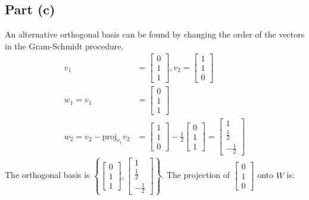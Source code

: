 \documentclass{article}
\begin{document}
\subsection*{Part (c)}
An alternative orthogonal basis can be found by changing the order of the vectors in the Gram-Schmidt procedure.
\begin{equation}
    \begin{split}
        v_1 & = \begin{bmatrix}0 \\ 1 \\ 1\end{bmatrix}, v_2 = \begin{bmatrix}1 \\ 1 \\ 0\end{bmatrix} \\
        w_1 = v_1 & = \begin{bmatrix}0 \\ 1 \\ 1\end{bmatrix} \\
        w_2 = v_2 - \mathrm{proj}_{v_1} v_2 & = \begin{bmatrix}1 \\ 1 \\ 0\end{bmatrix} - \frac{1}{2}\begin{bmatrix}0 \\ 1 \\ 1\end{bmatrix} = \begin{bmatrix}1 \\ \frac{1}{2} \\ -\frac{1}{2}\end{bmatrix}
    \end{split}
\end{equation}
The orthogonal basis is $\left\{\begin{bmatrix}0 \\ 1 \\ 1\end{bmatrix}, \begin{bmatrix}1 \\ \frac{1}{2} \\ -\frac{1}{2}\end{bmatrix}\right\}$. The projection of $\begin{bmatrix} 0 \\ 1 \\ 0 \end{bmatrix}$ onto $W$ is:
\end{document}
